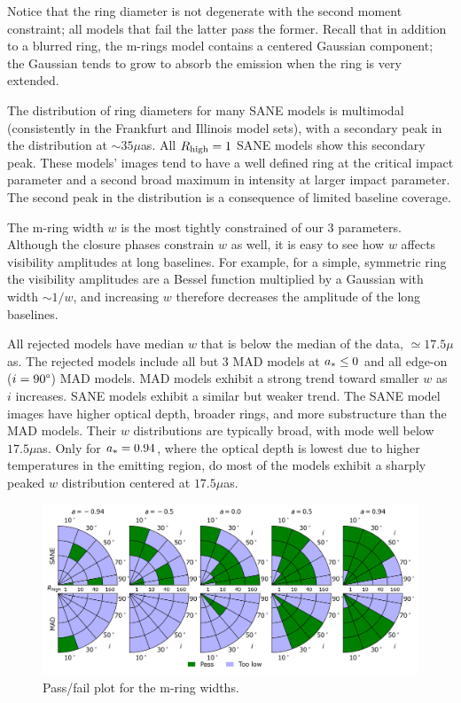 Notice that the ring diameter is not degenerate with the second moment constraint; all models that fail the latter pass the former.  Recall that in addition to a blurred ring, the m-rings model contains a centered Gaussian component; the Gaussian tends to grow to absorb the emission when the ring is very extended.

The distribution of ring diameters for many SANE models is multimodal (consistently in the Frankfurt and Illinois  model sets), with a secondary peak in the distribution at $\sim 35\mu$as.  All $R_\mathrm{high} = 1$ SANE models show this secondary peak.  These models' images tend to have a well defined ring at the critical impact parameter and a second broad maximum in intensity at larger impact parameter.  The second peak in the distribution is a consequence of limited baseline coverage.


The m-ring width $w$ is the most tightly constrained of our 3 parameters.  Although the closure phases constrain $w$ as well, it is easy to see how $w$ affects visibility amplitudes at long baselines.  For example, for a simple, symmetric ring the visibility amplitudes are a Bessel function multiplied by a Gaussian with width $\sim 1/w$, and increasing $w$ therefore decreases the amplitude of the long baselines.

All rejected models have median $w$ that is below the median of the data, $ \simeq 17.5\mu$as. The rejected models include all but 3 MAD models at $a_* \le 0$ and all edge-on ($i = 90\degree$) MAD models.  MAD models exhibit a strong trend toward smaller $w$ as $i$ increases.  SANE models exhibit a similar but weaker trend. The SANE model images have  higher optical depth, broader rings, and more substructure than the MAD models.  Their $w$ distributions are typically broad, with mode well below $17.5\mu$as.  Only for $a_* = 0.94$, where the optical depth is lowest due to higher temperatures in the emitting region, do most of the models exhibit a sharply peaked $w$ distribution centered at $17.5\mu$as.

\begin{figure}
 \centering
 \includegraphics[width=\textwidth]{./figures/Mring_w_Constraints.png}
  \caption{Pass/fail plot for the m-ring widths.}
\end{figure}

